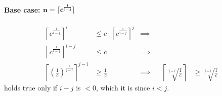 \documentclass{article}
\begin{document}
\begin{enumerate}
\begin{enumerate}[label={(\arabic*)}]
{                \paragraph*{Base case: \(\mathbf{n = \lceil c^{\frac{1}{i - j}} \rceil}\)}
                \begin{displaymath}
                    \begin{aligned}
                        \left\lceil c^{\frac{1}{i - j}} \right\rceil^i &\leq c \cdot \left\lceil c^{\frac{1}{i - j}} \right\rceil^j & \implies \\
                        \left\lceil c^{\frac{1}{i - j}} \right\rceil^{i - j} &\leq c & \implies \\
                        \left\lceil \left(\frac{1}{c}\right)^{\frac{1}{j - i}} \right\rceil^{j - i} &\geq \frac{1}{c} & \implies &&
                        \left\lceil \sqrt[j-i]{\frac{1}{c}} \right\rceil &\geq \sqrt[j-i]{\frac{1}{c}}
                    \end{aligned}
                \end{displaymath}
                holds true only if \(i - j\) is \(< 0\), which it is since \(i < j\).

}
\end{enumerate}
\end{enumerate}
\end{document}
